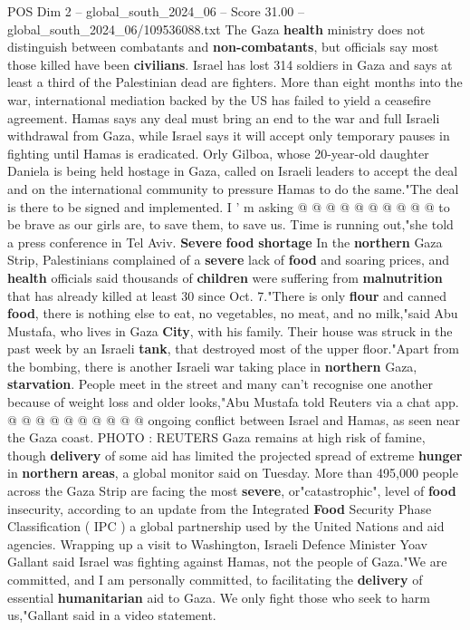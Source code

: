 \begin{textsample}{POS Dim 2 – global\_south\_2024\_06 – Score 31.00 – global\_south\_2024\_06/109536088.txt}
The Gaza \textbf{health} ministry does not distinguish between combatants and \textbf{non-combatants}, but officials say most those killed have been \textbf{civilians}.
Israel has lost 314 soldiers in Gaza and says at least a third of the Palestinian dead are fighters.
More than eight months into the war, international mediation backed by the US has failed to yield a ceasefire agreement.
Hamas says any deal must bring an end to the war and full Israeli withdrawal from Gaza, while Israel says it will accept only temporary pauses in fighting until Hamas is eradicated.
Orly Gilboa, whose 20-year-old daughter Daniela is being held hostage in Gaza, called on Israeli leaders to accept the deal and on the international community to pressure Hamas to do the same."The deal is there to be signed and implemented.
I ' m asking @ @ @ @ @ @ @ @ @ @ to be brave as our girls are, to save them, to save us.
Time is running out,"she told a press conference in Tel Aviv. \textbf{Severe} \textbf{food} \textbf{shortage} In the \textbf{northern} Gaza Strip, Palestinians complained of a \textbf{severe} lack of \textbf{food} and soaring prices, and \textbf{health} officials said thousands of \textbf{children} were suffering from \textbf{malnutrition} that has already killed at least 30 since Oct. 7."There is only \textbf{flour} and canned \textbf{food}, there is nothing else to eat, no vegetables, no meat, and no milk,"said Abu Mustafa, who lives in Gaza \textbf{City}, with his family.
Their house was struck in the past week by an Israeli \textbf{tank}, that destroyed most of the upper floor."Apart from the bombing, there is another Israeli war taking place in \textbf{northern} Gaza, \textbf{starvation}.
People meet in the street and many can't recognise one another because of weight loss and older looks,"Abu Mustafa told Reuters via a chat app. @ @ @ @ @ @ @ @ @ @ ongoing conflict between Israel and Hamas, as seen near the Gaza coast.
PHOTO : REUTERS Gaza remains at high risk of famine, though \textbf{delivery} of some aid has limited the projected spread of extreme \textbf{hunger} in \textbf{northern} \textbf{areas}, a global monitor said on Tuesday.
More than 495,000 people across the Gaza Strip are facing the most \textbf{severe}, or"catastrophic", level of \textbf{food} insecurity, according to an update from the Integrated \textbf{Food} Security Phase Classification ( IPC ) a global partnership used by the United Nations and aid agencies.
Wrapping up a visit to Washington, Israeli Defence Minister Yoav Gallant said Israel was fighting against Hamas, not the people of Gaza."We are committed, and I am personally committed, to facilitating the \textbf{delivery} of essential \textbf{humanitarian} aid to Gaza.
We only fight those who seek to harm us,"Gallant said in a video statement.

\end{textsample}
